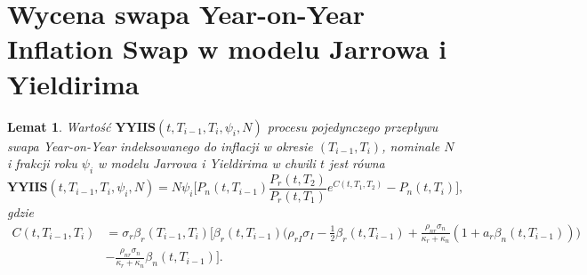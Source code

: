 \documentclass{mini}
\theoremstyle{mythstyle}
\newtheorem{Lemat}{Lemat}[chapter]
\begin{document}
	\section{Wycena swapa Year-on-Year Inflation Swap w modelu Jarrowa i Yieldirima}
	\begin{Lemat}
		Wartość $\textbf{YYIIS}(t,T_{i-1},T_{i},\psi_i,N)$ procesu pojedynczego przepływu swapa Year-on-Year indeksowanego do inflacji w okresie $(T_{i-1}, T_i)$, nominale $N$ i frakcji roku $\psi_i$ w modelu Jarrowa i Yieldirima w chwili $t$ jest równa
		\begin{equation*}
		\textbf{YYIIS}(t, T_{i-1},T_i,\psi_i,N) = N \psi_i \bigg[ P_n(t,T_{i-1}) \frac{P_r(t,T_2)}{P_r(t,T_1)} e^{C(t,T_1,T_2)} - P_n(t,T_i) \bigg],
		\end{equation*}
		gdzie
		\begin{align*}
		C(t,T_{i-1},T_i) &= \sigma_r\beta_r(T_{i-1},T_i) \bigg[ \beta_r(t,T_{i-1}) \bigg( \rho_{rI}\sigma_I - \frac{1}{2} \beta_r (t,T_{i-1}) 
		+ \frac{\rho_{nr}\sigma_n}{\kappa_r + \kappa_n} (1+a_r\beta_n(t,T_{i-1})) \bigg)\\&-  \frac{\rho_{nr}\sigma_n}{\kappa_r + \kappa_n} \beta_n(t,T_{i-1}) \bigg].
		\end{align*}
	\end{Lemat}
\end{document}

